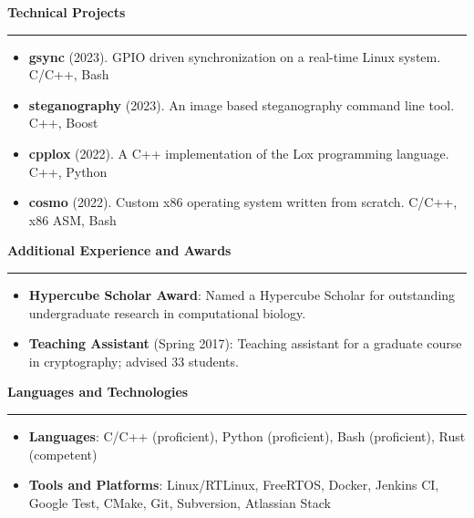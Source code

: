 \documentclass[10pt,letterpaper]{article}
\begin{document}
\medskip

\begin{large}
    \textbf{Technical Projects}
\end{large}

\smallskip \hrule \smallskip

\begin{itemize}[topsep=0pt]
    \setlength\itemsep{0.2em}
    \item \textbf{gsync} (2023). GPIO driven synchronization on a real-time
                                 Linux system. C/C++, Bash
    \item \textbf{steganography} (2023). An image based steganography command
                                         line tool. C++, Boost
    \item \textbf{cpplox} (2022). A C++ implementation of the Lox programming
                                  language. C++, Python
    \item \textbf{cosmo} (2022). Custom x86 operating system written from
                                 scratch. C/C++, x86 ASM, Bash
\end{itemize}

\medskip

\begin{large}
    \textbf{Additional Experience and Awards}
\end{large}

\smallskip \hrule \smallskip

\begin{itemize}[topsep=0pt]
    \setlength\itemsep{0.2em}
    \item \textbf{Hypercube Scholar Award}: Named a Hypercube Scholar for
          outstanding undergraduate research in computational biology.
    \item \textbf{Teaching Assistant} (Spring 2017): Teaching assistant for a
          graduate course in cryptography; advised 33 students.
\end{itemize}

\medskip

\begin{large}
    \textbf{Languages and Technologies}
\end{large}

\smallskip \hrule \smallskip

\begin{itemize}[topsep=0pt]
    \setlength\itemsep{0.2em}
    \item \textbf{Languages}: C/C++ (proficient),
                              Python (proficient),
                              Bash (proficient),
                              Rust (competent)
    \item \textbf{Tools and Platforms}: Linux/RTLinux,
                                        FreeRTOS,
                                        Docker,
                                        Jenkins CI,
                                        Google Test,
                                        CMake,
                                        Git,
                                        Subversion,
                                        Atlassian Stack
\end{itemize}
\end{document}

